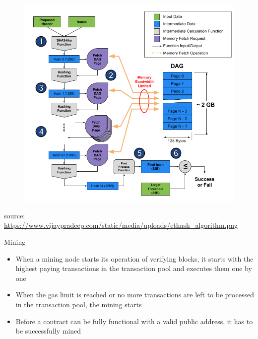 \documentclass[9pt]{beamer}
\begin{document}
\begin{frame}
	\begin{figure}[]
		\centering
		\includegraphics  [scale=0.3]{Images/ethash}
	\end{figure}
	\begin{scriptsize}
		source: \href{https://www.vijaypradeep.com/blog/2017-04-28-ethereums-memory-hardness-explained/}{https://www.vijaypradeep.com/static/media/uploads/ethash\_algorithm.png}
	\end{scriptsize}
\end{frame}


\begin{frame}{Mining}
	\begin{itemize}
		\item When a mining node starts its operation of verifying blocks, it starts with the highest paying transactions in the transaction pool and executes them one by one
		\item When the gas limit is reached or no more transactions are left to be processed in the transaction pool, the mining starts
		\item Before a contract can be fully functional with a valid public address, it has to be successfully mined
	\end{itemize}
\end{frame}
\end{document}
